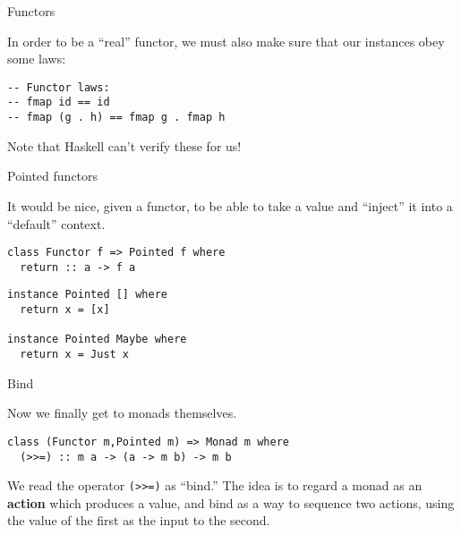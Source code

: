 %
\begin{frame}[fragile]{Functors}

In order to be a ``real'' functor, we must also make sure that our instances
obey some laws:

\begin{block}{}
\begin{verbatim}
-- Functor laws:
-- fmap id == id
-- fmap (g . h) == fmap g . fmap h
\end{verbatim}
\end{block}

Note that Haskell can't verify these for us!

\end{frame}

%
\begin{frame}[fragile]{Pointed functors}

It would be nice, given a functor, to be able to take a value and ``inject'' it
into a ``default'' context.

\begin{block}{}
\begin{verbatim}
class Functor f => Pointed f where
  return :: a -> f a
\end{verbatim}
\end{block}

\begin{block}{}
\begin{verbatim}
instance Pointed [] where
  return x = [x]

instance Pointed Maybe where
  return x = Just x
\end{verbatim}
\end{block}

\end{frame}

%
\begin{frame}[fragile]{Bind}

Now we finally get to monads themselves.

\begin{block}{}
\begin{verbatim}
class (Functor m,Pointed m) => Monad m where
  (>>=) :: m a -> (a -> m b) -> m b
\end{verbatim}
\end{block}

We read the operator \texttt{(>>=)} as ``bind.'' The idea is to regard a monad
as an \textbf{action} which produces a value, and bind as a way to sequence two
actions, using the value of the first as the input to the second.

\end{frame}

